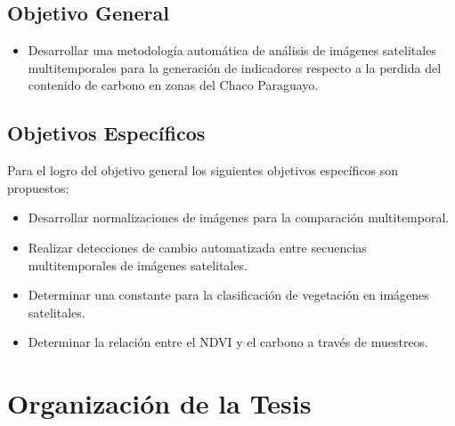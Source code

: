 \subsection{Objetivo General}

\begin{itemize}
\item Desarrollar una metodolog\'ia autom\'atica de an\'alisis de im\'agenes satelitales multitemporales para la generaci\'on de indicadores respecto a la perdida del contenido de carbono en zonas del Chaco Paraguayo.
\end{itemize}
\subsection{Objetivos Específicos}
Para el logro del objetivo general los siguientes objetivos espec\'ificos son propuestos:
\begin{itemize}

\item Desarrollar normalizaciones de im\'agenes para la comparación multitemporal. 
\item Realizar detecciones de cambio automatizada entre secuencias multitemporales de im\'agenes satelitales.   
\item Determinar una constante para la clasificaci\'on de vegetaci\'on en im\'agenes satelitales.
\item Determinar la relación entre el NDVI y el carbono a trav\'es de muestreos.
 
    


\end{itemize}



\section{Organización de la Tesis}

